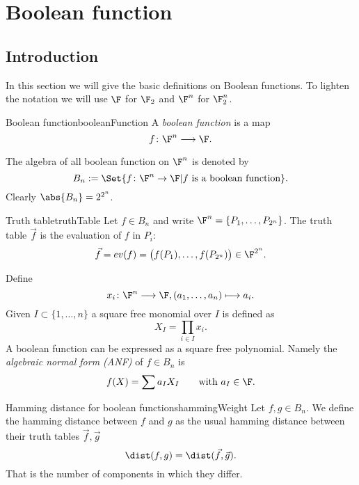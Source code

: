 %
%
\chapter{Boolean function}

\section{Introduction}

In this section we will give the basic definitions on Boolean functions. To lighten the notation we will use \(\F\) for \(\F_2\) and \(\F^n\) for \(\F_2^n\).

\begin{defn}{Boolean function}{booleanFunction}
	A \emph{boolean function} is a map
	\[
		f\colon \F^n \longrightarrow \F.
	\]
\end{defn}

\begin{notz}
	The algebra of all boolean function on \(\F^n\) is denoted by
	\[
		B_n := \Set{f \colon \F^n \to \F | f \text{ is a boolean function}}.
	\]
	Clearly \(\abs{B_n}=2^{2^n}\).
\end{notz}

\begin{defn}{Truth table}{truthTable}
	Let \(f\in B_n\) and write \(\F^n = \{P_1,\ldots,P_{2^n}\}\). The truth table \(\vec{f}\) is the evaluation of \(f\) in \(P_i\):
	\[
		\vec{f} = ev(f) = \big(f(P_1),\ldots,f(P_{2^n})\big) \in \F^{2^n}.
	\]
\end{defn}

Define
\[
	x_i \colon \F^n \longrightarrow \F, (a_1,\ldots,a_n) \longmapsto a_i.
\]
Given \(I\subset \{1,\ldots,n\}\) a square free monomial over \(I\) is defined as
\[
	X_I = \prod_{i\in I} x_i.
\]
A boolean function can be expressed as a square free polynomial. Namely the \emph{algebraic normal form (ANF)} of \(f \in B_n\) is 
\[
	f(X) = \sum a_I X_I \qquad\text{with }a_I \in \F.
\]

\begin{defn}{Hamming distance for boolean functions}{hammingWeight}
	Let \(f,g\in B_n\). We define the hamming distance between \(f\) and \(g\) as the usual hamming distance between their truth tables \(\vec{f},\vec{g}\)
	\[
		\dist(f,g) = \dist(\vec{f},\vec{g}).
	\]
	That is the number of components in which they differ.
\end{defn}

